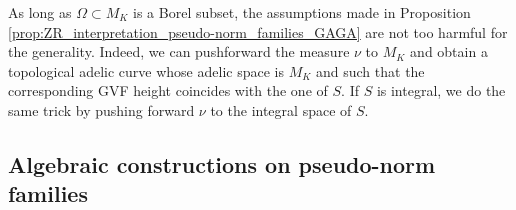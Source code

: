\documentclass [11pt,reqno]{amsart}
\newcommand{\1}{\mathmybb{1}}
\begin{document}
\begin{remark}
\label{rem:ZR_interpretation_pseudo-norm_families_GAGA}
As long as $\Omega\subset M_{K}$ is a Borel subset, the assumptions made in Proposition \ref{prop:ZR_interpretation_pseudo-norm_families_GAGA} are not too harmful for the generality. Indeed, we can pushforward the measure $\nu$ to $M_{K}$ and obtain a topological adelic curve whose adelic space is $M_{K}$ and such that the corresponding GVF height coincides with the one of $S$. If $S$ is integral, we do the same trick by pushing forward $\nu$ to the integral space of $S$.  
\end{remark}


\subsection{Algebraic constructions on pseudo-norm families}
\label{sub:algebraic_constructions_semi-norm_families}
\end{document}
